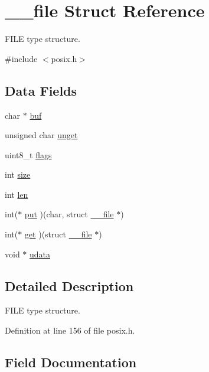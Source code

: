 \hypertarget{struct____file}{}\section{\+\_\+\+\_\+file Struct Reference}
\label{struct____file}


F\+I\+LE type structure.  




{\ttfamily \#include $<$posix.\+h$>$}

\subsection*{Data Fields}
\begin{DoxyCompactItemize}
\item 
char $\ast$ \hyperlink{struct____file_a3e5a85ae919a90efbb7cb44ccb54fe46}{buf}
\item 
unsigned char \hyperlink{struct____file_a1d139ae3cb11a1fada469a49f7d3d3b6}{unget}
\item 
uint8\+\_\+t \hyperlink{struct____file_a8d11df8679502efee09740f97d7c277b}{flags}
\item 
int \hyperlink{struct____file_aff4a1ca8b6a12460812928afae81248d}{size}
\item 
int \hyperlink{struct____file_a30309efd13a75ed510bb2370debafaf8}{len}
\item 
int($\ast$ \hyperlink{struct____file_a01c8b217e42cc11b6a7f8429114e9d46}{put} )(char, struct \hyperlink{struct____file}{\+\_\+\+\_\+file} $\ast$)
\item 
int($\ast$ \hyperlink{struct____file_a2d816b077c3af0425344fe4b283dad33}{get} )(struct \hyperlink{struct____file}{\+\_\+\+\_\+file} $\ast$)
\item 
void $\ast$ \hyperlink{struct____file_abe6f3bdb4df4119277132eb3e13a4628}{udata}
\end{DoxyCompactItemize}


\subsection{Detailed Description}
F\+I\+LE type structure. 

Definition at line 156 of file posix.\+h.



\subsection{Field Documentation}
\mbox{\label{struct____file_a3e5a85ae919a90efbb7cb44ccb54fe46}} 
